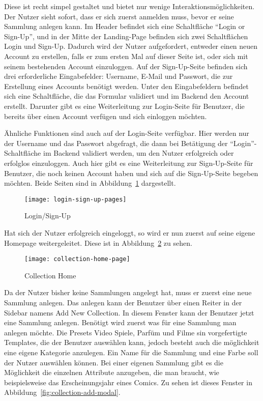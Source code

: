 Diese ist recht simpel gestaltet und bietet nur wenige Interaktionsmöglichkeiten.
Der Nutzer sieht sofort, dass er sich zuerst anmelden muss, bevor er seine Sammlung anlegen kann.
Im Header befindet sich eine Schaltfläche “Login or Sign-Up”, und in der Mitte der Landing-Page befinden sich zwei Schaltflächen Login und Sign-Up.
Dadurch wird der Nutzer aufgefordert, entweder einen neuen Account zu erstellen, falls er zum ersten Mal auf dieser Seite ist, oder sich mit seinem bestehenden Account einzuloggen.
\newpage
Auf der Sign-Up-Seite befinden sich drei erforderliche Eingabefelder: Username, E-Mail und Passwort, die zur Erstellung eines Accounts benötigt werden.
Unter den Eingabefeldern befindet sich eine Schaltfläche, die das Formular validiert und im Backend den Account erstellt.
Darunter gibt es eine Weiterleitung zur Login-Seite für Benutzer, die bereits über einen Account verfügen und sich einloggen möchten.

Ähnliche Funktionen sind auch auf der Login-Seite verfügbar.
Hier werden nur der Username und das Passwort abgefragt, die dann bei Betätigung der “Login”-Schaltfläche im Backend validiert werden, um den Nutzer erfolgreich oder erfolglos einzuloggen.
Auch hier gibt es eine Weiterleitung zur Sign-Up-Seite für Benutzer, die noch keinen Account haben und sich auf die Sign-Up-Seite begeben möchten.
Beide Seiten sind in Abbildung~\ref{fig:login-sign-up-pages} dargestellt.

\begin{figure}[h]
    \centering
    \texttt{[image: login-sign-up-pages]}
    \caption{Login/Sign-Up}
    \label{fig:login-sign-up-pages}
\end{figure}

Hat sich der Nutzer erfolgreich eingeloggt, so wird er nun zuerst auf seine eigene Homepage weitergeleitet.
Diese ist in Abbildung~\ref{fig:collection-home-page} zu sehen.

\newpage

\begin{figure}[h]
    \centering
    \texttt{[image: collection-home-page]}
    \caption{Collection Home}
    \label{fig:collection-home-page}
\end{figure}

Da der Nutzer bisher keine Sammlungen angelegt hat, muss er zuerst eine neue Sammlung anlegen.
Das anlegen kann der Benutzer über einen Reiter in der Sidebar namens Add New Collection.
In diesem Fenster kann der Benutzer jetzt eine Sammlung anlegen.
Benötigt wird zuerst was für eine Sammlung man anlegen möchte.
Die Presets Video Spiele, Parfüm und Filme sin vorgefertigte Templates, die der Benutzer auswählen kann, jedoch besteht auch die möglichkeit eine eigene Kategorie anzulegen.
Ein Name für die Sammlung und eine Farbe soll der Nutzer auswählen können.
Bei einer eigenen Sammlung gibt es die Möglichkeit die einzelnen Attribute anzugeben, die man braucht, wie beispielsweise das Erscheinungsjahr eines Comics.
Zu sehen ist dieses Fenster in Abbildung~\ref{fig:collection-add-modal}.


